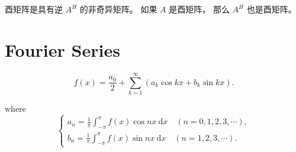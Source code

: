 酉矩阵是具有逆 $ A^{H} $ 的非奇异矩阵。 如果 $ A $ 是酉矩阵， 那么 $ A^{H} $ 也是酉矩阵。

\section{Fourier Series}

\begin{definition}[傅里叶级数]
    \begin{equation}
f(x)=\frac{a_{0}}{2}+\sum_{k=1}^{\infty}\left(a_{k} \cos k x+b_{k} \sin k x\right) .
\end{equation}

where \begin{equation} \left\{\begin{array}{l}a_{n}=\frac{1}{\pi} \int_{-\pi}^{\pi} f(x) \cos n x \mathrm{~d} x \quad(n=0,1,2,3, \cdots), \\ b_{n}=\frac{1}{\pi} \int_{-\pi}^{\pi} f(x) \sin n x \mathrm{~d} x \quad(n=1,2,3, \cdots) .\end{array}\right. \end{equation}
\end{definition}

